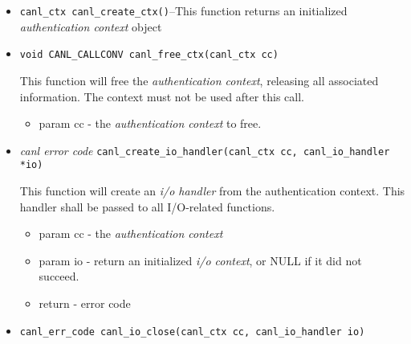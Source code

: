 \begin{itemize}
  \item \verb'canl_ctx canl_create_ctx()'--This function
  returns an initialized \textit{authentication context} object
  \item \verb'void CANL_CALLCONV canl_free_ctx(canl_ctx cc)'

  This function will free the \textit{authentication context}, releasing 
  all associated information.  The context must not be used after this call.
  \begin{itemize}
    \item param cc - the \textit{authentication context} to free.
  \end{itemize}
  \item \textit{canl error code}
  \verb'canl_create_io_handler(canl_ctx cc, canl_io_handler *io)'

  This function will create an \textit{i/o handler} from the authentication 
  context. This handler shall be passed to all I/O-related functions.
  \begin{itemize}
    \item param cc - the \textit{authentication context}
    \item param io -  return an initialized \textit{i/o context}, 
or NULL if it did not succeed.
    \item return - \CANL error code
  \end{itemize}

  \item \verb'canl_err_code canl_io_close(canl_ctx cc, canl_io_handler io)'


\end{itemize}
